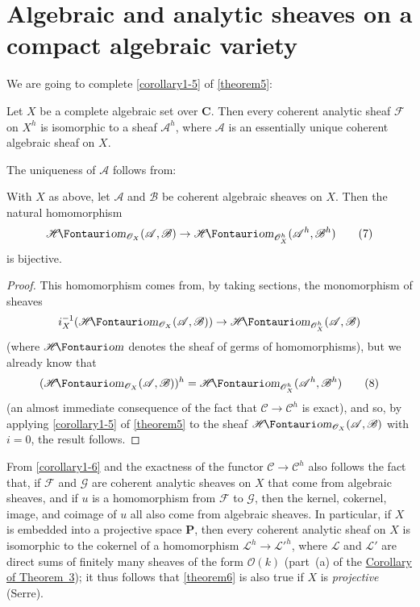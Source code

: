 \documentclass{article}
\theoremstyle{plain}
\newenvironment{theorem}[1]
    {\renewcommand\theinnercustomtheorem{#1}\innercustomtheorem}
    {\endinnercustomtheorem}
\newenvironment{corollary}[1]
    {\renewcommand\theinnercustomcorollary{#1}\innercustomcorollary}
    {\endinnercustomcorollary}
\theoremstyle{definition}
\newcommand{\sh}[1]{{\mathscr{#1}}}
\newcommand{\cat}[1]{{\mathcal{#1}}}
\newcommand{\shHom}{\sh{H}\textup{\kern-2.2pt{\Fontauri\slshape om}}}
\newcommand{\oldpage}[1]{\marginpar{\footnotesize$\Big\vert$ \textit{p.~#1}}}
\begin{document}
\section{Algebraic and analytic sheaves on a compact algebraic variety}
\label{section8}

We are going to complete \cref{corollary1-5} of \cref{theorem5}:

\begin{theorem}{6}
\label{theorem6}
  Let $X$ be a complete algebraic set over $\mathbf{C}$.
  Then every coherent analytic sheaf $\sh{F}$ on $X^h$ is isomorphic to a sheaf $\sh{A}^h$, where $\sh{A}$ is an essentially unique coherent algebraic sheaf on $X$.
\end{theorem}

The uniqueness of $\sh{A}$ follows from:

\begin{corollary}{1}
\label{corollary1-6}
  With $X$ as above, let $\sh{A}$ and $\sh{B}$ be coherent algebraic sheaves on $X$.
  Then the natural homomorphism
  \[
  \label{equation7}
    \shHom_{\sh{O}_X}(\sh{A},\sh{B}) \to \shHom_{\sh{O}_X^h}(\sh{A}^h,\sh{B}^h)
    \tag{7}
  \]
  is bijective.
\end{corollary}

\begin{proof}
  This homomorphism comes from, by taking sections, the monomorphism of sheaves
  \[
    i_X^{-1}(\shHom_{\sh{O}_X}(\sh{A},\sh{B})) \to \shHom_{\sh{O}_X^h}(\sh{A},\sh{B})
  \]
  (where $\shHom$ denotes the sheaf of germs of homomorphisms), but we already know that
  \[
  \label{equation8}
    (\shHom_{\sh{O}_X}(\sh{A},\sh{B}))^h = \shHom_{\sh{O}_X^h}(\sh{A}^h,\sh{B}^h)
    \tag{8}
  \]
  (an almost immediate consequence of the fact that $\cat{C}\to\cat{C}^h$ is exact), and so, by applying \cref{corollary1-5} of \cref{theorem5} to the sheaf $\shHom_{\sh{O}_X}(\sh{A},\sh{B})$ with $i=0$, the result follows.
\end{proof}

From \cref{corollary1-6} and the exactness of the functor $\cat{C}\to\cat{C}^h$ also follows the fact that, if $\sh{F}$ and $\sh{G}$ are coherent analytic sheaves on $X$ that come from algebraic sheaves, and if $u$ is a homomorphism from $\sh{F}$ to $\sh{G}$, then the kernel, cokernel, image, and coimage of $u$ all also come
\oldpage{2-15}
from algebraic sheaves.
In particular, if $X$ is embedded into a projective space $\mathbf{P}$, then every coherent analytic sheaf on $X$ is isomorphic to the cokernel of a homomorphism $\sh{L}^h\to\sh{L}'^h$, where $\sh{L}$ and $\sh{L}'$ are direct sums of finitely many sheaves of the form $\sh{O}(k)$ (part~(a) of the \hyperref[corollary-3]{Corollary of Theorem~3});
it thus follows that \cref{theorem6} is also true if $X$ is \emph{projective} (Serre).
\end{document}
